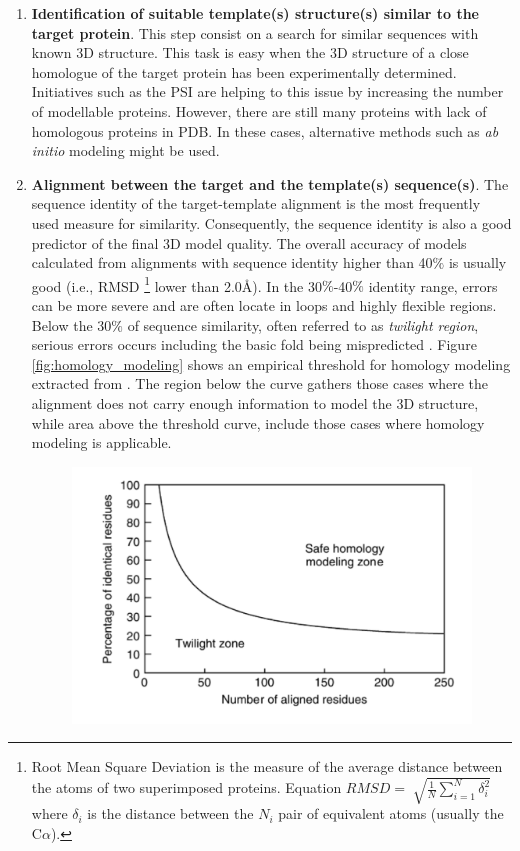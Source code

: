 \documentclass[11pt, b5paper,twoside]{tesi_upf}
\begin{document}
\begin{enumerate}
\item \textbf{Identification of suitable template(s) structure(s) similar to the target protein}. This step consist on a search for similar sequences with known 3D structure. This task is easy when the 3D structure of a close homologue of the target protein has been experimentally determined. Initiatives such as the PSI \cite{Norvell2007} are helping to this issue by increasing the number of modellable proteins. However, there are still many proteins with lack of homologous proteins in PDB. In these cases, alternative methods such as \textit{ab initio} modeling might be used.  

\item \textbf{Alignment between the target and the template(s) sequence(s)}. The sequence identity of the target-template alignment is the most frequently used measure for similarity. Consequently, the sequence identity is also a good predictor of the final 3D model quality. The overall accuracy of models calculated from alignments with sequence identity higher than 40$\%$ is usually good (i.e., RMSD \footnote{Root Mean Square Deviation is the measure of the average distance between the atoms of two superimposed proteins. Equation $RMSD=\sqrt[]{\frac{1}{N} \sum\limits_{i=1}^N \delta_i^2}$ where $\delta_i$ is the distance between the $N_i$ pair of equivalent atoms (usually the C$\alpha$).}  lower than 2.0\AA). In the 30$\%$-40$\%$ identity range, errors can be more severe and are often locate in loops and highly flexible regions. Below the 30$\%$ of sequence similarity, often referred to as \textit{twilight region}, serious errors occurs including the basic fold being mispredicted \cite{Baker2001, twilight1996}.
Figure \ref{fig:homology_modeling} shows an empirical threshold for homology modeling extracted from \cite{Sander1991}. The region below the curve gathers those cases where the alignment does not carry enough information to model the 3D structure, while area above the threshold curve, include those cases where homology modeling is applicable.  
\begin{figure}[htbp]

  \centering
  	\includegraphics[scale=0.35]{../figures/homology_plot.pdf} %


\end{figure}
\end{enumerate}
\end{document}
